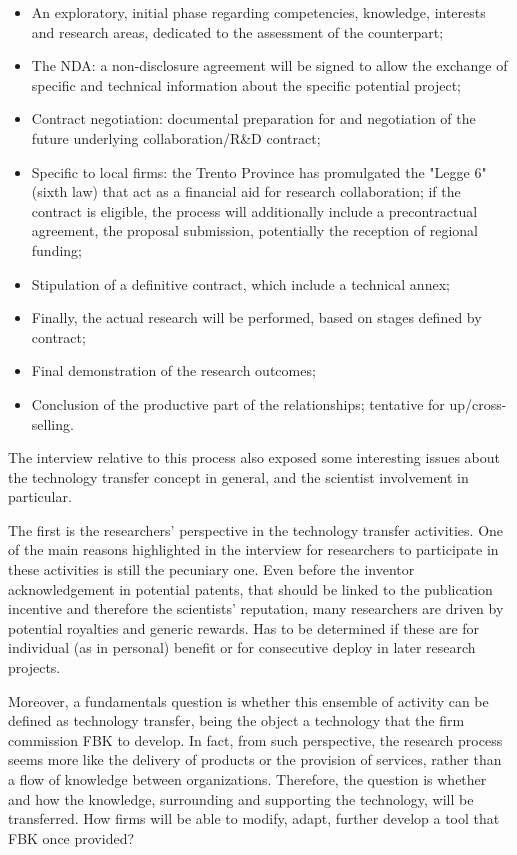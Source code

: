 \begin{itemize}

\item An exploratory, initial phase regarding competencies, knowledge, interests and research areas, dedicated to the assessment of the counterpart;
\item The NDA: a non-disclosure agreement will be signed to allow the exchange of specific and technical information about the specific potential project;
\item Contract negotiation: documental preparation for and negotiation of the future underlying collaboration/R\&D contract;
\item Specific to local firms: the Trento Province has promulgated the "Legge 6" (sixth law) that act as a financial aid for research collaboration; if the contract is eligible, the process will additionally include a precontractual agreement, the proposal submission, potentially the reception of regional funding;
\item Stipulation of a definitive contract, which include a technical annex;
\item Finally, the actual research will be performed, based on stages defined by contract;
\item Final demonstration of the research outcomes;
\item Conclusion of the productive part of the relationships; tentative for up/cross-selling.

\end{itemize}

The interview relative to this process also exposed some interesting issues about the technology transfer concept in general, and the scientist involvement in particular.

The first is the researchers’ perspective in the technology transfer activities. One of the main reasons highlighted in the interview for researchers to participate in these activities is still the pecuniary one. Even before the inventor acknowledgement in potential patents, that should be linked to the publication incentive and therefore the scientists’ reputation, many researchers are driven by potential royalties and generic rewards. Has to be determined if these are for individual (as in personal) benefit or for consecutive deploy in later research projects. 

Moreover, a fundamentals question is whether this ensemble of activity can be defined as technology transfer, being the object a technology that the firm commission FBK to develop. In fact, from such perspective, the research process seems more like the delivery of products or the provision of services, rather than a flow of knowledge between organizations. Therefore, the question is whether and how the knowledge, surrounding and supporting the technology, will be transferred. How firms will be able to modify, adapt, further develop a tool that FBK once provided?

